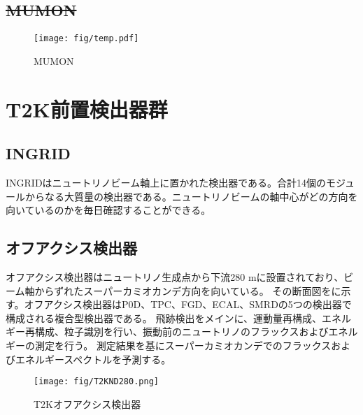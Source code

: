 \subsection{\sout{MUMON}}

\begin{figure}[htb]
\begin{center}
\texttt{[image: fig/temp.pdf]}
\caption[MUMON]{MUMON}
\label{MUMON}
\end{center}
\end{figure}

\fi %

\section{T2K前置検出器群}
\subsection{INGRID}
INGRIDはニュートリノビーム軸上に置かれた検出器である。合計14個のモジュールからなる大質量の検出器である。ニュートリノビームの軸中心がどの方向を向いているのかを毎日確認することができる。


\subsection{オフアクシス検出器}
オフアクシス検出器はニュートリノ生成点から下流280 mに設置されており、ビーム軸からずれたスーパーカミオカンデ方向を向いている。
その断面図をに示す。オフアクシス検出器はP0D、TPC、FGD、ECAL、SMRDの5つの検出器で構成される複合型検出器である。
飛跡検出をメインに、運動量再構成、エネルギー再構成、粒子識別を行い、振動前のニュートリノのフラックスおよびエネルギーの測定を行う。
測定結果を基にスーパーカミオカンデでのフラックスおよびエネルギースペクトルを予測する。

\begin{figure}[htbp]
\centering
\texttt{[image: fig/T2KND280.png]}
\caption[T2Kオフアクシス検出器]{T2Kオフアクシス検出器}
\label{TOAD}
\end{figure}

